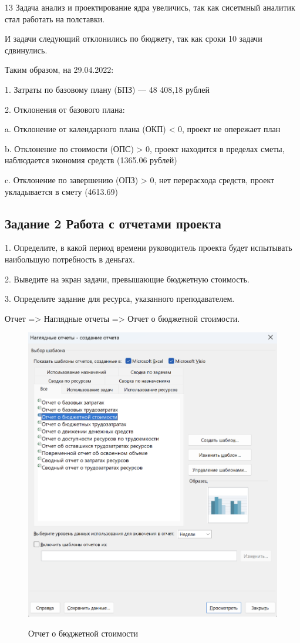 13 Задача анализ и проектирование ядра увеличись, так как сисетмный аналитик стал работать на полставки.

И задачи следующий отклонились по бюджету, так как сроки 10 задачи сдвинулись.

Таким образом, на 29.04.2022:

1. Затраты по базовому плану (БПЗ) –-- 48 408,18 рублей

2. Отклонения от базового плана:

a. Отклонение от календарного плана (ОКП) < 0, проект не опережает
план

b. Отклонение по стоимости (ОПС) > 0, проект находится в пределах
сметы, наблюдается экономия средств (1365.06 рублей)

c. Отклонение по завершению (ОПЗ) > 0, нет перерасхода средств,
проект укладывается в смету (4613.69)

\subsection{Задание 2 Работа с отчетами проекта}

1. Определите, в какой период времени руководитель проекта будет
испытывать наибольшую потребность в деньгах.

2. Выведите на экран задачи, превышающие бюджетную стоимость.

3. Определите задание для ресурса, указанного преподавателем.

Отчет => Наглядные отчеты => Отчет о бюджетной стоимости.

\begin{figure}[ht!]
	\includegraphics[width=0.75\linewidth]{assets/images/Отчет о бюджетной стоимости.png}
	\label{fig:r2}
	\caption{Отчет о бюджетной стоимости}
\end{figure}
\FloatBarrier

